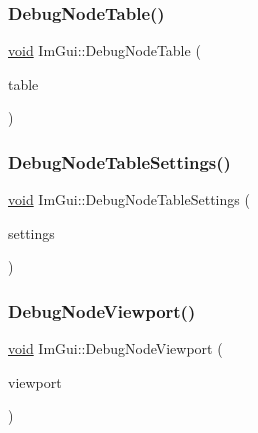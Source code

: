 \mbox{\label{namespaceImGui_ae944ffc599add73d6f3220165475ffd8}} 
\subsubsection{\texorpdfstring{Debug\+Node\+Table()}{DebugNodeTable()}}
{\footnotesize\ttfamily \hyperlink{imgui__impl__opengl3__loader_8h_ac668e7cffd9e2e9cfee428b9b2f34fa7}{void} Im\+Gui\+::\+Debug\+Node\+Table (\begin{DoxyParamCaption}\item[{\hyperlink{structImGuiTable}{Im\+Gui\+Table} $\ast$}]{table }\end{DoxyParamCaption})}

\mbox{\label{namespaceImGui_a476f5fea6e50fae946a366567da7f89f}} 
\subsubsection{\texorpdfstring{Debug\+Node\+Table\+Settings()}{DebugNodeTableSettings()}}
{\footnotesize\ttfamily \hyperlink{imgui__impl__opengl3__loader_8h_ac668e7cffd9e2e9cfee428b9b2f34fa7}{void} Im\+Gui\+::\+Debug\+Node\+Table\+Settings (\begin{DoxyParamCaption}\item[{\hyperlink{structImGuiTableSettings}{Im\+Gui\+Table\+Settings} $\ast$}]{settings }\end{DoxyParamCaption})}

\mbox{\label{namespaceImGui_aa5e5f50f28c04a26264c0943c7281171}} 
\subsubsection{\texorpdfstring{Debug\+Node\+Viewport()}{DebugNodeViewport()}}
{\footnotesize\ttfamily \hyperlink{imgui__impl__opengl3__loader_8h_ac668e7cffd9e2e9cfee428b9b2f34fa7}{void} Im\+Gui\+::\+Debug\+Node\+Viewport (\begin{DoxyParamCaption}\item[{\hyperlink{structImGuiViewportP}{Im\+Gui\+ViewportP} $\ast$}]{viewport }\end{DoxyParamCaption})}

